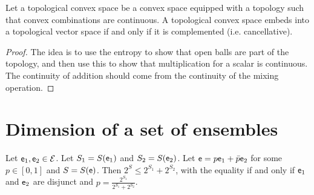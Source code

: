 \begin{conj}\label{pm_es_ensemblesAreTVS}
	Let a topological convex space be a convex space equipped with a topology such that convex combinations are continuous. A topological convex space embeds into a topological vector space if and only if it is complemented (i.e. cancellative).
\end{conj}

\begin{proof}
	The idea is to use the entropy to show that open balls are part of the topology, and then use this to show that multiplication for a scalar is continuous. The continuity of addition should come from the continuity of the mixing operation.
\end{proof}

\section{Dimension of a set of ensembles}

\begin{prop}\label{pm_es_exponentialEntropySubadditivity}
	Let $\mathsf{e}_1, \mathsf{e}_2 \in \mathcal{E}$. Let $S_1 = S(\mathsf{e}_1)$ and $S_2 = S(\mathsf{e}_2)$. Let $\mathsf{e} = p \mathsf{e}_1 + \bar{p} \mathsf{e}_2$ for some $p \in [0,1]$ and $S = S(\mathsf{e})$. Then $2^S \leq 2^{S_1} + 2^{S_2}$, with the equality if and only if $\mathsf{e}_1$ and $\mathsf{e}_2$ are disjunct and $p = \frac{2^{S_1}}{2^{S_1} + 2^{S_2}}$.
\end{prop}

